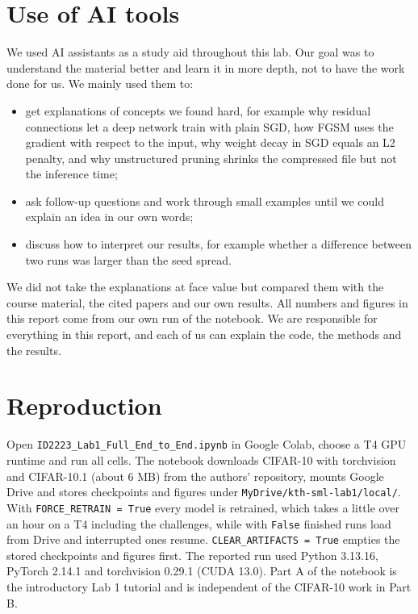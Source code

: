 \documentclass[11pt,a4paper]{article}
\begin{document}
\section*{Use of AI tools}
We used AI assistants as a study aid throughout this lab. Our goal was to understand the material better and learn it in more depth, not to have the work done for us. We mainly used them to:
\begin{itemize}
\item get explanations of concepts we found hard, for example why residual connections let a deep network train with plain SGD, how FGSM uses the gradient with respect to the input, why weight decay in SGD equals an L2 penalty, and why unstructured pruning shrinks the compressed file but not the inference time;
\item ask follow-up questions and work through small examples until we could explain an idea in our own words;
\item discuss how to interpret our results, for example whether a difference between two runs was larger than the seed spread.
\end{itemize}
We did not take the explanations at face value but compared them with the course material, the cited papers and our own results. All numbers and figures in this report come from our own run of the notebook. We are responsible for everything in this report, and each of us can explain the code, the methods and the results.

\section*{Reproduction}
Open \texttt{ID2223\_Lab1\_\allowbreak Full\_\allowbreak End\_\allowbreak to\_\allowbreak End.ipynb} in Google Colab, choose a T4 GPU runtime and run all cells. The notebook downloads CIFAR-10 with torchvision and CIFAR-10.1 (about 6 MB) from the authors' repository, mounts Google Drive and stores checkpoints and figures under \texttt{MyDrive/kth-sml-lab1/local/}. With \texttt{FORCE\_RETRAIN = True} every model is retrained, which takes a little over an hour on a T4 including the challenges, while with \texttt{False} finished runs load from Drive and interrupted ones resume. \texttt{CLEAR\_ARTIFACTS = True} empties the stored checkpoints and figures first. The reported run used Python 3.13.16, PyTorch 2.14.1 and torchvision 0.29.1 (CUDA 13.0). Part A of the notebook is the introductory Lab 1 tutorial and is independent of the CIFAR-10 work in Part B.
\end{document}
